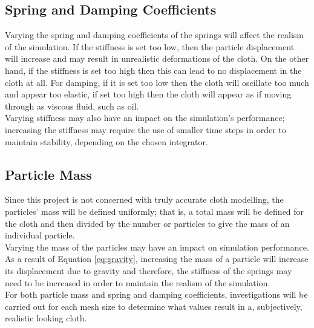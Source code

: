 \subsection{Spring and Damping Coefficients}
Varying the spring and damping coefficients of the springs will affect the realism of the simulation. If the stiffness is set too low, then the particle displacement will increase and may result in unrealistic deformations of the cloth. On the other hand, if the stiffness is set too high then this can lead to no displacement in the cloth at all. For damping, if it is set too low then the cloth will oscillate too much and appear too elastic, if set too high then the cloth will appear as if moving through as viscous fluid, such as oil.
\\Varying stiffness may also have an impact on the simulation's performance; increasing the stiffness may require the use of smaller time steps in order to maintain stability, depending on the chosen integrator.

\subsection{Particle Mass}
Since this project is not concerned with truly accurate cloth modelling, the particles' mass will be defined uniformly; that is, a total mass will be defined for the cloth and then divided by the number or particles to give the mass of an individual particle.
\\Varying the mass of the particles may have an impact on simulation performance. As a result of Equation \ref{eq:gravity}, increasing the mass of a particle will increase its displacement due to gravity and therefore, the stiffness of the springs may need to be increased in order to maintain the realism of the simulation. 
\\For both particle mass and spring and damping coefficients, investigations will be carried out for each mesh size to determine what values result in a, subjectively, realistic looking cloth.

